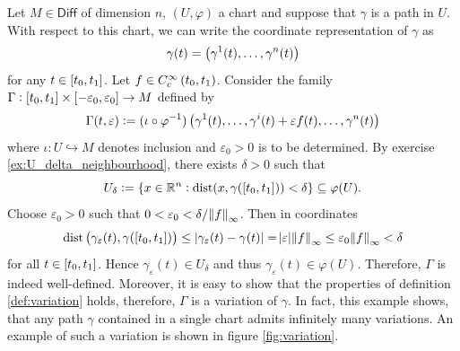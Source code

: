 \begin{example}
	\label{ex:perturbation_along_single_direction}
	Let $M \in \mathsf{Diff}$ of dimension $n$, $(U,\varphi)$ a chart and suppose that $\gamma$ is a path in $U$. With respect to this chart, we can write the coordinate representation of $\gamma$ as
	\begin{equation*}
		\gamma(t) = \del[1]{\gamma^1(t),\dots,\gamma^n(t)}
	\end{equation*}
	\noindent for any $t \in \intcc[0]{t_0,t_1}$. Let $f \in C^\infty_c\intoo[0]{t_0,t_1}$. Consider the family $\Gamma : \intcc[0]{t_0,t_1} \times \intcc[0]{-\varepsilon_0,\varepsilon_0} \to M$ defined by
	\begin{equation*}
		\Gamma(t,\varepsilon) := (\iota \circ \varphi^{-1})\del[1]{\gamma^1(t),\dots,\gamma^i(t) + \varepsilon f(t),\dots,\gamma^n(t)}
	\end{equation*}
	\noindent where $\iota : U \hookrightarrow M$ denotes inclusion and $\varepsilon_0 > 0$ is to be determined. By exercise \ref{ex:U_delta_neighbourhood}, there exists $\delta > 0$ such that
	\begin{equation*}
		U_\delta := \cbr[0]{x \in \mathbb{R}^n : \dist(x,\gamma(\intcc[0]{t_0,t_1})) < \delta} \subseteq \varphi(U).
	\end{equation*}
	Choose $\varepsilon_0 > 0$ such that $0 < \varepsilon_0 < \delta/\norm{f}_\infty$. Then in coordinates
	\begin{equation*}
		\dist\del[1]{\gamma_\varepsilon(t), \gamma(\intcc[0]{t_0,t_1})} \leq \abs[0]{\gamma_\varepsilon(t) - \gamma(t)} = \abs{\varepsilon} \norm{f}_\infty \leq \varepsilon_0 \norm{f}_\infty < \delta 
	\end{equation*}
	\noindent for all $t \in \intcc[0]{t_0,t_1}$. Hence $\gamma_\varepsilon(t) \in U_\delta$ and thus $\gamma_\varepsilon(t) \in \varphi(U)$. Therefore, $\Gamma$ is indeed well-defined. Moreover, it is easy to show that the properties of definition \ref{def:variation} holds, therefore, $\Gamma$ is a variation of $\gamma$. In fact, this example shows, that any path $\gamma$ contained in a single chart admits infinitely many variations. An example of such a variation is shown in figure \ref{fig:variation}.


\end{example}
